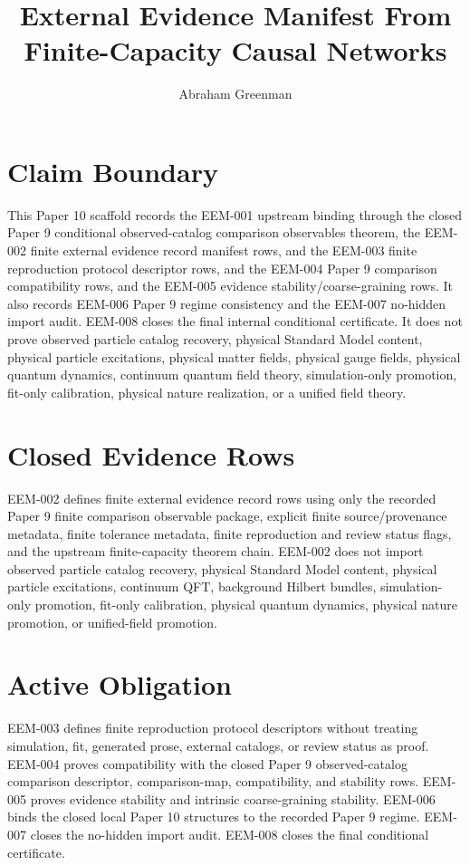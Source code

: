 \documentclass{article}
\title{External Evidence Manifest From Finite-Capacity Causal Networks}
\author{Abraham Greenman}
\date{}
\begin{document}
\maketitle

\section{Claim Boundary}

This Paper 10 scaffold records the EEM-001 upstream binding through the closed
Paper 9 conditional observed-catalog comparison observables theorem, the
EEM-002 finite external evidence record manifest rows, and the EEM-003 finite
reproduction protocol descriptor rows, and the EEM-004 Paper 9 comparison
compatibility rows, and the EEM-005 evidence stability/coarse-graining rows.
It also records EEM-006 Paper 9 regime consistency and the EEM-007 no-hidden
import audit. EEM-008 closes the final internal conditional certificate. It
does not prove observed particle catalog recovery, physical Standard Model content, physical particle
excitations, physical matter fields, physical gauge fields, physical quantum
dynamics, continuum quantum field theory, simulation-only promotion,
fit-only calibration, physical nature realization, or a unified field theory.

\section{Closed Evidence Rows}

EEM-002 defines finite external evidence record rows using only the recorded
Paper 9 finite comparison observable package, explicit finite
source/provenance metadata, finite tolerance metadata, finite reproduction and
review status flags, and the upstream finite-capacity theorem chain. EEM-002
does not import observed particle catalog recovery, physical Standard Model
content, physical particle excitations, continuum QFT, background Hilbert
bundles, simulation-only promotion, fit-only calibration, physical quantum
dynamics, physical nature promotion, or unified-field promotion.

\section{Active Obligation}

EEM-003 defines finite reproduction protocol descriptors without treating
simulation, fit, generated prose, external catalogs, or review status as
proof. EEM-004 proves compatibility with the closed Paper 9 observed-catalog
comparison descriptor, comparison-map, compatibility, and stability rows.
EEM-005 proves evidence stability and intrinsic coarse-graining stability.
EEM-006 binds the closed local Paper 10 structures to the recorded Paper 9
regime. EEM-007 closes the no-hidden import audit. EEM-008 closes the final
conditional certificate.
\end{document}
